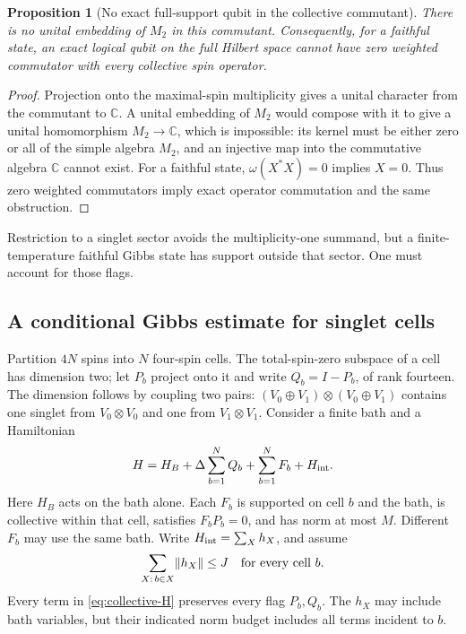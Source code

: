 \documentclass[11pt,reqno]{amsart}
\numberwithin{equation}{section}
\newtheorem{proposition}[theorem]{Proposition}
\theoremstyle{definition}
\theoremstyle{remark}
\DeclarePairedDelimiter{\norm}{\lVert}{\rVert}
\begin{document}
\begin{proposition}[No exact full-support qubit in the collective commutant]
\label{prop:commutant}
There is no unital embedding of \(M_2\) in this commutant.
Consequently, for a faithful state, an exact logical qubit on the full
Hilbert space cannot have zero weighted commutator with every collective
spin operator.
\end{proposition}
\begin{proof}
Projection onto the maximal-spin multiplicity gives a unital character
from the commutant to \(\mathbb C\). A unital embedding of \(M_2\)
would compose with it to give a unital homomorphism
\(M_2\to\mathbb C\), which is impossible: its kernel must be either
zero or all of the simple algebra \(M_2\), and an injective map into
the commutative algebra \(\mathbb C\) cannot exist.
For a faithful state, \(\omega(X^*X)=0\) implies \(X=0\).
Thus zero weighted commutators imply exact operator commutation and
the same obstruction.
\end{proof}

Restriction to a singlet sector avoids the multiplicity-one summand,
but a finite-temperature faithful Gibbs state has support outside
that sector. One must account for those flags.

\subsection{A conditional Gibbs estimate for singlet cells}

Partition \(4N\) spins into \(N\) four-spin cells. The total-spin-zero
subspace of a cell has dimension two; let \(P_b\) project onto it and
write \(Q_b=I-P_b\), of rank fourteen.
The dimension follows by coupling two pairs:
\((V_0\oplus V_1)\otimes(V_0\oplus V_1)\) contains one singlet
from \(V_0\otimes V_0\) and one from \(V_1\otimes V_1\).
Consider a finite bath and a Hamiltonian
\begin{equation}\label{eq:collective-H}
 H=H_B+\Delta\sum_{b=1}^NQ_b+\sum_{b=1}^N F_b+H_{\rm int}.
\end{equation}
Here \(H_B\) acts on the bath alone.
Each \(F_b\) is supported on cell \(b\) and the bath, is collective
within that cell, satisfies \(F_bP_b=0\), and has norm at most \(M\).
Different \(F_b\) may use the same bath.
Write \(H_{\rm int}=\sum_X h_X\), and assume
\[
       \sum_{X:\,b\in X}\norm{h_X}\le J
                   \quad\text{for every cell }b.
\]
Every term in \eqref{eq:collective-H} preserves every flag \(P_b,Q_b\).
The \(h_X\) may include bath variables, but their indicated norm
budget includes all terms incident to \(b\).
\end{document}
